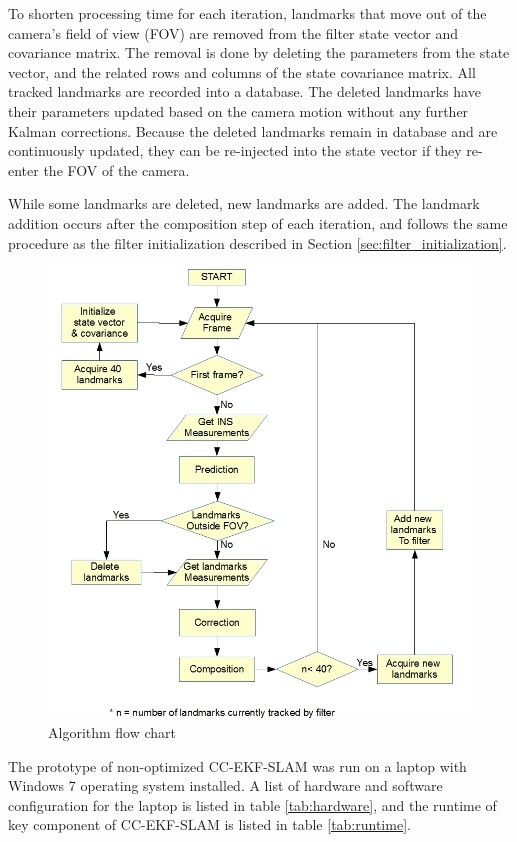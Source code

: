 To shorten processing time for each iteration, landmarks that move
out of the camera's field of view (FOV) are removed from the filter
state vector and covariance matrix. The removal is done by deleting
the parameters from the state vector, and the related rows and columns
of the state covariance matrix. All tracked landmarks are recorded
into a database. The deleted landmarks have their parameters updated
based on the camera motion without any further Kalman corrections.
Because the deleted landmarks remain in database and are continuously
updated, they can be re-injected into the state vector if they
re-enter the FOV of the camera.

While some landmarks are deleted, new landmarks are added. The
landmark addition occurs after the composition step of each
iteration, and follows the same procedure as the filter
initialization described in Section \ref{sec:filter_initialization}.


\begin{figure}[h]
\centering
\includegraphics[width=14cm, keepaspectratio=true]{./Figures/flow_chart.jpg}
\caption{Algorithm flow chart}
\label{fig:flowchart}
\end{figure}
\FloatBarrier

The prototype of non-optimized CC-EKF-SLAM was run on a laptop with
Windows 7 operating system installed. A list of hardware and software
configuration for the laptop is listed in table \ref{tab:hardware},
and the runtime of key component of CC-EKF-SLAM is listed in table
\ref{tab:runtime}. 

